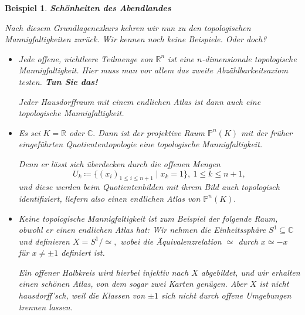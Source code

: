 \documentclass[12pt]{scrbook}   %
\newtheorem{bspX}[alles]{Beispiel}
\newenvironment{bsp}[1]{\begin{bspX}{\bf #1}\par\rm}{\end{bspX}}
\newcommand{\da}{\coloneqq}
\begin{document}
\begin{bsp} {\bf Schönheiten des Abendlandes}

{\rm Nach diesem Grundlagenexkurs kehren wir nun zu den topologischen 
Mannigfaltigkeiten zurück. Wir kennen noch keine Beispiele. Oder doch?

\begin{itemize}
\item[a)] Jede offene, nichtleere Teilmenge von $\mathbb R^n$ ist eine
$n$-dimensionale topologische Mannigfaltigkeit. Hier muss man vor allem das
zweite Abzählbarkeitsaxiom testen. {\bf Tun Sie das!}

Jeder Hausdorffraum mit einem endlichen Atlas ist dann auch eine topologische 
Mannigfaltigkeit.

\item[b)] Es sei $K=\mathbb R$ oder $\mathbb C.$ Dann ist der projektive Raum
$\mathbb P^n(K)$ mit der früher eingeführten Quotiententopologie eine 
topologische Mannigfaltigkeit.

Denn er lässt sich überdecken durch die offenen Mengen 
$$U_k\da\{(x_i)_{1\leq i\leq n+1} \mid x_k = 1\},\ 1\leq k\leq n+1,$$
und diese werden beim Quotientenbilden mit ihrem Bild auch topologisch 
identifiziert, liefern also einen endlichen Atlas von $\mathbb P^n(K).$

\item[c)] Keine topologische Mannigfaltigkeit ist zum Beispiel der folgende
Raum, obwohl er einen endlichen Atlas hat: Wir nehmen die Einheitssphäre 
$S^1\subseteq \mathbb C$ und definieren $X=S^1/\simeq,$
wobei die Äquivalenzrelation $\simeq$ durch $x\simeq -x$ für $x\neq 
\pm1$ definiert ist. 

Ein offener Halbkreis wird hierbei injektiv nach $X$ abgebildet, und wir 
erhalten einen schönen Atlas, von dem sogar zwei Karten genügen. Aber $X$ 
ist nicht hausdorff'sch, weil die Klassen von $\pm 1$ sich nicht durch offene
Umgebungen trennen lassen.
\end{itemize}
}
\end{bsp}





%
\end{document}
